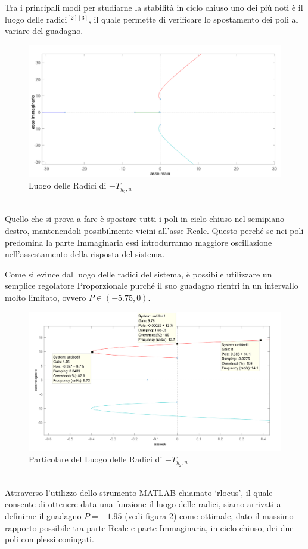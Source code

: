 Tra i principali modi per studiarne la stabilità in ciclo chiuso uno dei più noti è il luogo delle radici$^{[2][3]}$, il quale permette di verificare lo spostamento dei poli al variare del guadagno.
\begin{figure}[ht]
	\centering
	\includegraphics[scale=0.26]{RLocusPendoloNormale.PNG}
	\caption{Luogo delle Radici di $-T_{y_2,u}$}
	\label{RLocusPendoloNormale}
\end{figure}
\\Quello che si prova a fare è spostare tutti i poli in ciclo chiuso nel semipiano destro, mantenendoli possibilmente vicini all'asse Reale.
Questo perché se nei poli predomina la parte Immaginaria essi introdurranno maggiore oscillazione nell'assestamento della risposta del sistema. 

Come si evince dal luogo delle radici del sistema, è possibile utilizzare un semplice regolatore Proporzionale purché il suo guadagno rientri in un intervallo molto limitato, ovvero $P\in(-5.75,0)$.
\begin{figure}[ht]
	\centering
	\includegraphics[scale=0.3]{gain268.PNG}
	\caption{Particolare del Luogo delle Radici di $-T_{y_2,u}$}
	\label{gainOttimaleft}
\end{figure}
\\Attraverso l'utilizzo dello strumento MATLAB chiamato `rlocus', il quale consente di ottenere data una funzione il luogo delle radici, siamo arrivati a definirne il guadagno $P=-1.95$ (vedi figura \ref{gainOttimaleft}) come ottimale, dato il massimo rapporto possibile tra parte Reale e parte Immaginaria, in ciclo chiuso, dei due poli complessi coniugati.

